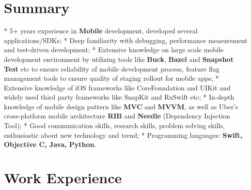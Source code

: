 \documentclass[10pt,letterpaper,sans]{moderncv}        %
\begin{document}
\makecvtitle



\vspace*{-1.3cm}
\section{Summary}
\cvitem{} {* 5+ years experience in \textbf{Mobile} development, developed several applications/SDKs;}
\cvitem{} {* Deep familiarity with debugging, performance measurement and test-driven development; }
\cvitem{} {* Extensive knowledge on large scale mobile development environment by utilizing tools like \textbf{Buck}, \textbf{Bazel} and \textbf{Snapshot Test} etc to ensure reliability of mobile development process, feature flag management tools to ensure quality of staging rollout for mobile apps; }
\cvitem{} {*  Extensive knowledge of iOS frameworks like CoreFoundation and UIKit and widely used third party frameworks like SnapKit and RxSwift etc;  }
\cvitem{} {* In-depth knowledge of mobile design pattern like \textbf{MVC} and \textbf{MVVM}, as well as Uber's cross-platform mobile architecture \textbf{RIB} and \textbf{Needle} (Dependency Injection Tool); }
\cvitem{} {* Good communication skills, research skills, problem solving skills, enthusiastic about new technology and trend; }
\cvitem{} {* Programming languages: \textbf{Swift, Objective C, Java, Python}.}

\section{Work Experience}
\end{document}
